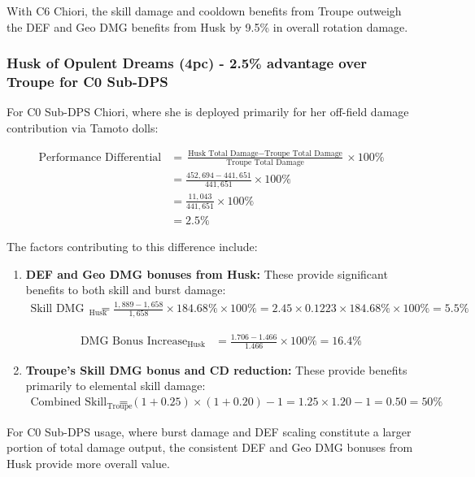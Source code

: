 \documentclass[12pt,a4paper]{article}
\begin{document}
With C6 Chiori, the skill damage and cooldown benefits from Troupe outweigh the DEF and Geo DMG benefits from Husk by 9.5\% in overall rotation damage.

\subsubsection{Husk of Opulent Dreams (4pc) - 2.5\% advantage over Troupe for C0 Sub-DPS}

For C0 Sub-DPS Chiori, where she is deployed primarily for her off-field damage contribution via Tamoto dolls:

\begin{align}
\text{Performance Differential} &= \frac{\text{Husk Total Damage} - \text{Troupe Total Damage}}{\text{Troupe Total Damage}} \times 100\% \\
&= \frac{452,694 - 441,651}{441,651} \times 100\% \\
&= \frac{11,043}{441,651} \times 100\% \\
&= 2.5\%
\end{align}

The factors contributing to this difference include:

\begin{enumerate}
    \item \textbf{DEF and Geo DMG bonuses from Husk:} These provide significant benefits to both skill and burst damage:
    \begin{align}
    \text{Skill DMG Increase from DEF}_{\text{Husk}} &= \frac{1,889 - 1,658}{1,658} \times 184.68\% \times 100\% = 2.45 \times 0.1223 \times 184.68\% \times 100\% = 5.5\%
    \end{align}
    
    \begin{align}
    \text{DMG Bonus Increase}_{\text{Husk}} &= \frac{1.706 - 1.466}{1.466} \times 100\% = 16.4\%
    \end{align}
    
    \item \textbf{Troupe's Skill DMG bonus and CD reduction:} These provide benefits primarily to elemental skill damage:
    \begin{align}
    \text{Combined Skill Benefit}_{\text{Troupe}} &= (1 + 0.25) \times (1 + 0.20) - 1 = 1.25 \times 1.20 - 1 = 0.50 = 50\%
    \end{align}
\end{enumerate}

For C0 Sub-DPS usage, where burst damage and DEF scaling constitute a larger portion of total damage output, the consistent DEF and Geo DMG bonuses from Husk provide more overall value.
\end{document}
